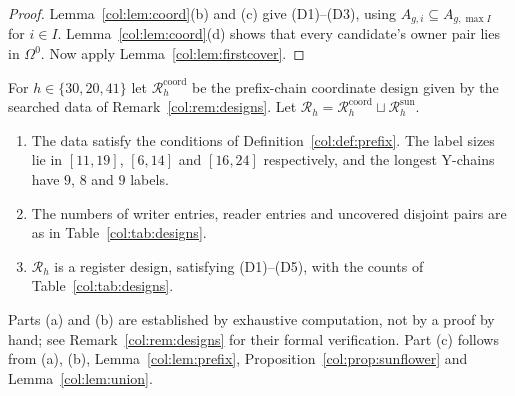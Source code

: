 \begin{proof}
Lemma~\ref{col:lem:coord}(b) and (c) give (D1)--(D3), using $A_{g,i}\subseteq A_{g,\max I}$ for $i\in I$.
Lemma~\ref{col:lem:coord}(d) shows that every candidate's owner pair lies in $\Omega^0$. Now apply
Lemma~\ref{col:lem:firstcover}.
\end{proof}

\begin{proposition}\label{col:prop:designs}
For $h\in\{30,20,41\}$ let $\mathcal R^{\mathrm{coord}}_h$ be the prefix-chain coordinate design given by the
searched data of Remark~\ref{col:rem:designs}. Let $\mathcal R_h=\mathcal R^{\mathrm{coord}}_h\sqcup\mathcal R^{\mathrm{sun}}_h$.
\begin{enumerate}
\item[(a)] The data satisfy the conditions of Definition~\ref{col:def:prefix}. The label sizes lie in
  $[11,19]$, $[6,14]$ and $[16,24]$ respectively, and the longest Y-chains have $9$, $8$ and $9$ labels.
\item[(b)] The numbers of writer entries, reader entries and uncovered disjoint pairs are as in
  Table~\ref{col:tab:designs}.
\item[(c)] $\mathcal R_h$ is a register design, satisfying (D1)--(D5), with the counts of
  Table~\ref{col:tab:designs}.
\end{enumerate}
Parts (a) and (b) are established by exhaustive computation, not by a proof by hand; see
Remark~\ref{col:rem:designs} for their formal verification. Part (c) follows
from (a), (b), Lemma~\ref{col:lem:prefix}, Proposition~\ref{col:prop:sunflower} and
Lemma~\ref{col:lem:union}.
\end{proposition}

